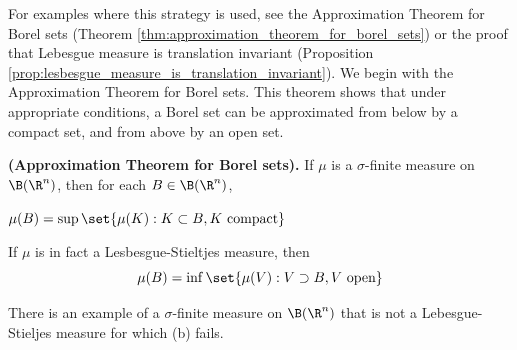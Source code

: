 \documentclass{article} %
\begin{document}
For examples where this strategy is used, see the  Approximation Theorem for Borel sets (Theorem \ref{thm:approximation_theorem_for_borel_sets}) or the proof that Lebesgue measure is translation invariant (Proposition \ref{prop:lesbesgue_measure_is_translation_invariant}). We begin with the Approximation Theorem for Borel sets.  This theorem shows that under appropriate conditions, a Borel set can be approximated from below by a compact set, and from above by an open set. 





\begin{theorem}
\textbf{(Approximation Theorem for Borel sets).} If $\mu$ is a $\sigma$-finite measure on $\B(\R^n)$, then for each $B \in \B(\R^n)$,
\begin{alphabate}
\item $\mu(B) = \sup \set{\mu(K) : K \subset B, K \text{ compact}}$
\item If $\mu$ is in fact a Lesbesgue-Stieltjes measure, then
\[ \mu(B) = \inf \set{\mu(V) : V \supset B, V \text{ open}}\]
\item There is an example of a $\sigma$-finite measure on $\B(\R^n)$ that is not a Lebesgue-Stieljes measure for which (b) fails.
\end{alphabate}
\label{thm:approximation_theorem_for_borel_sets}	
\end{theorem}
\end{document}
